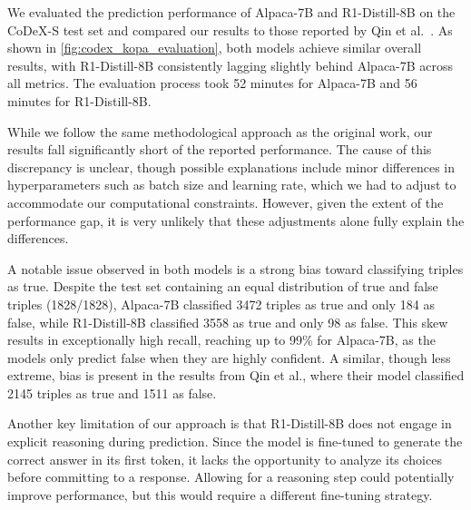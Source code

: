 \documentclass[12pt,a4paper]{article}
\newcommand{\modelalpaca}{Alpaca-7B\xspace}
\newcommand{\modeldeepseek}{R1-Distill-8B\xspace}
\begin{document}
We evaluated the prediction performance of \modelalpaca and \modeldeepseek on the CoDeX-S test set and compared our results to those reported by Qin et al.~\cite{qin2023kopa}.
As shown in \cref{fig:codex_kopa_evaluation}, both models achieve similar overall results, with \modeldeepseek consistently lagging slightly behind \modelalpaca across all metrics.
The evaluation process took 52 minutes for \modelalpaca and 56 minutes for \modeldeepseek.

While we follow the same methodological approach as the original work, our results fall significantly short of the reported performance.
The cause of this discrepancy is unclear, though possible explanations include minor differences in hyperparameters such as batch size and learning rate, which we had to adjust to accommodate our computational constraints.
However, given the extent of the performance gap, it is very unlikely that these adjustments alone fully explain the differences.

A notable issue observed in both models is a strong bias toward classifying triples as true.
Despite the test set containing an equal distribution of true and false triples (1828/1828), \modelalpaca classified 3472 triples as true and only 184 as false, while \modeldeepseek classified 3558 as true and only 98 as false.
This skew results in exceptionally high recall, reaching up to 99\% for \modelalpaca, as the models only predict false when they are highly confident.
A similar, though less extreme, bias is present in the results from Qin et al., where their model classified 2145 triples as true and 1511 as false.

Another key limitation of our approach is that \modeldeepseek does not engage in explicit reasoning during prediction.
Since the model is fine-tuned to generate the correct answer in its first token, it lacks the opportunity to analyze its choices before committing to a response.
Allowing for a reasoning step could potentially improve performance, but this would require a different fine-tuning strategy.
\end{document}
